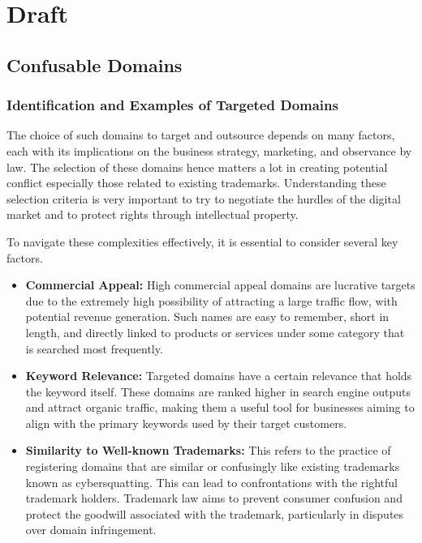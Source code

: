 \chapter{Draft}

\section{Confusable Domains}
\subsection{Identification and Examples of Targeted Domains}

The choice of such domains to target and outsource depends on many factors, each with its implications on the business strategy, marketing, and observance by law. The selection of these domains hence matters a lot in creating potential conflict especially those related to existing trademarks. Understanding these selection criteria is very important to try to negotiate the hurdles of the digital market and to protect rights through intellectual property. 

To navigate these complexities effectively, it is essential to consider several key factors. 

\begin{itemize}
  \item \textbf{Commercial Appeal:} High commercial appeal domains are lucrative targets due to the extremely high possibility of attracting a large traffic flow, with potential revenue generation. Such names are easy to remember, short in length, and directly linked to products or services under some category that is searched most frequently.\cite{Li2002ConflictDomainTrademark}
  
  \item \textbf{Keyword Relevance:} Targeted domains have a certain relevance that holds the keyword itself. These domains are ranked higher in search engine outputs and attract organic traffic, making them a useful tool for businesses aiming to align with the primary keywords used by their target customers.
  
  \item \textbf{Similarity to Well-known Trademarks:} This refers to the practice of registering domains that are similar or confusingly like existing trademarks known as cybersquatting. This can lead to confrontations with the rightful trademark holders. Trademark law aims to prevent consumer confusion and protect the goodwill associated with the trademark, particularly in disputes over domain infringement.
\end{itemize}

